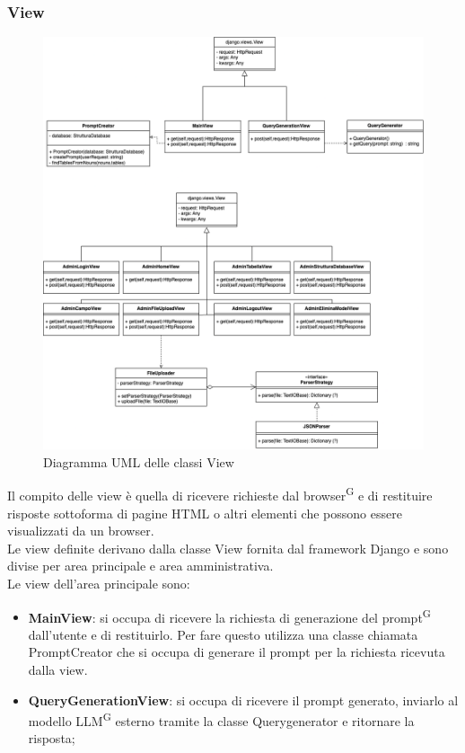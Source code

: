 \documentclass[5pt]{article}
\begin{document}
	
	\subsubsection{View}
	
	\begin{figure}[H]
		\includegraphics[scale=0.50]{UML_classes/views.png}
		\caption{Diagramma UML delle classi View}
		\centering
	\end{figure}

	
	Il compito delle view è quella di ricevere richieste dal browser\textsuperscript{G} e di restituire risposte sottoforma di pagine HTML o altri elementi che possono essere visualizzati da un browser.\\
	
	Le view definite derivano dalla classe View fornita dal framework Django e sono divise per area principale e area amministrativa.\\
	
	Le view dell'area principale sono:
	\begin{itemize}
		\item  \textbf{MainView}: si occupa di ricevere la richiesta di generazione del prompt\textsuperscript{G} dall'utente e di restituirlo. Per fare questo utilizza una classe chiamata PromptCreator che si occupa di generare il prompt per la richiesta ricevuta dalla view.
		\item \textbf{QueryGenerationView}: si occupa di ricevere il prompt generato, inviarlo al modello LLM\textsuperscript{G} esterno tramite la classe Querygenerator e ritornare la risposta;
	\end{itemize}
\end{document}
